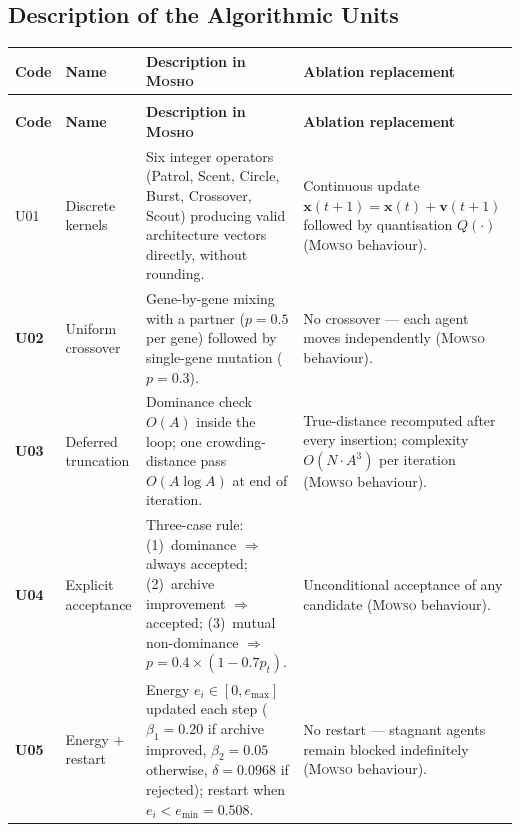 \documentclass[11pt,a4paper]{article}
\newcommand{\mosho}{\textsc{Mosho}}
\newcommand{\mowso}{\textsc{Mowso}}
\begin{document}
\subsection{Description of the Algorithmic Units}
\label{sec:intro_units}


\begin{longtable}{>{\bfseries\ttfamily}p{1.0cm} p{2.8cm} p{5.4cm} p{4.4cm}}
\toprule
\textbf{Code} & \textbf{Name} &
\textbf{Description in \mosho{}} & \textbf{Ablation replacement} \\
\midrule
\endfirsthead
\multicolumn{4}{l}{\small\itshape (continued)}\\
\toprule
\textbf{Code} & \textbf{Name} &
\textbf{Description in \mosho{}} & \textbf{Ablation replacement} \\
\midrule
\endhead
\bottomrule
\endlastfoot

U01 & Discrete kernels &
  Six integer operators (Patrol, Scent, Circle, Burst, Crossover, Scout)
  producing valid architecture vectors directly, without rounding. &
  Continuous update $\mathbf{x}(t{+}1) = \mathbf{x}(t)+\mathbf{v}(t{+}1)$
  followed by quantisation $Q(\cdot)$ (\mowso{} behaviour). \\[4pt]

U02 & Uniform crossover &
  Gene-by-gene mixing with a partner ($p{=}0.5$ per gene) followed by
  single-gene mutation ($p{=}0.3$). &
  No crossover --- each agent moves independently (\mowso{} behaviour). \\[4pt]

U03 & Deferred truncation &
  Dominance check $O(A)$ inside the loop; one crowding-distance pass
  $O(A\log A)$ at end of iteration. &
  True-distance recomputed after every insertion; complexity
  $O(N{\cdot}A^3)$ per iteration (\mowso{} behaviour). \\[4pt]

U04 & Explicit acceptance &
  Three-case rule: (1)~dominance $\Rightarrow$ always accepted;
  (2)~archive improvement $\Rightarrow$ accepted;
  (3)~mutual non-dominance $\Rightarrow$ $p{=}0.4{\times}(1{-}0.7p_t)$. &
  Unconditional acceptance of any candidate (\mowso{} behaviour). \\[4pt]

U05 & Energy + restart &
  Energy $e_i\!\in\![0,e_{\max}]$ updated each step
  ($\beta_1{=}0.20$ if archive improved, $\beta_2{=}0.05$ otherwise,
  $\delta{=}0.0968$ if rejected); restart when $e_i<e_{\min}{=}0.508$. &
  No restart --- stagnant agents remain blocked indefinitely
  (\mowso{} behaviour). \\[4pt]


\end{longtable}
\end{document}
